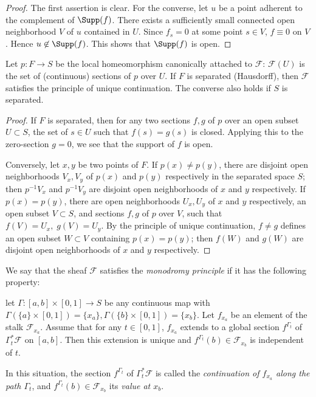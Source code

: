 \begin{proof}
 The first assertion is clear. For the converse, let $u$ be a point adherent to the complement 
 of $\Supp(f)$. There exists a sufficiently small connected open
 neighborhood $V$ of $u$ contained in $U$. Since $f_s=0$ at some
 point $s\in V$, $f\equiv 0$ on $V$. Hence $u\not\in\Supp(f)$. This shows that $\Supp(f)$ is open.
\end{proof}

\begin{lem}\label{lem-separated}
 Let $p: F\rightarrow S$
 be the local homeomorphism canonically attached to
 $\mathcal{F} $: $\mathcal{F}(U)$ is the set of (continuous) sections of $p$ over $U$. 
 If $F$ is separated (\ie Hausdorff), then $\mathcal{F}$ satisfies the
 principle of unique continuation. The converse also holds if $S$ is
 separated.
\end{lem}

\begin{proof} If $F$ is separated, then for any two sections $f, g$ of
 $p$ over an open subset $U\subset S$, the set of $s\in U$ such that
 $f(s)=g(s)$ is closed.  Applying this to the zero-section $g=0$, we see
 that the support of $f$ is open.

 Conversely, let $x,y $ be two points of $F$. If $p(x)\neq p(y)$, there
 are disjoint open neighborhoods $V_x, V_y$ of $p(x)$ and $p(y)$
 respectively in the separated space $S$; then $p^{-1}V_x$ and
 $p^{-1}V_y$ are disjoint open neighborhoods of $x$ and $y$
 respectively. If $p(x)= p(y)$, there are open neighborhoods $U_x, U_y$
 of $x$ and $y$ respectively, an open subset $V\subset S$, and sections
 $f,g$ of $p$ over $V$, such that $f(V)=U_x,\;g(V)=U_y$. By the
 principle of unique continuation, $f\neq g$ defines an open subset
 $W\subset V$ containing $p(x)=p(y)$; then $f(W)$ and $g(W)$ are
 disjoint open neighborhoods of $x$ and $y$ respectively.
\end{proof}

\begin{dfn}
 We say that the sheaf $\mathcal{F}$ 
 satisfies the {\it monodromy principle} if it has the following property:

 let $\Gamma: [a,b]\times [0,1] \rightarrow S$ be any 
 continuous map with
 $\Gamma(\{a\}\times [0,1])=\{x_a\}, \Gamma(\{b\}\times
 [0,1])=\{x_b\}$. Let $f_{x_a}$ be an element of the stalk
 $\mathcal{F}_{x_a}$. Assume that for any
 $t\in [0,1]$, $f_{x_a}$ extends to a global section $f^{\Gamma_t}$ of
 $\Gamma_t^{\ast} \mathcal{F}$ on
 $[a,b]$. Then this extension is unique and
 $f^{\Gamma_t}(b)\in \mathcal{F}_{x_b}$ is independent of $t$.

 In this situation, the section $f^{\Gamma_t}$ of 
 $\Gamma_t^{\ast} \mathcal{F}$ is called the
 {\it continuation of $f_{x_a}$ along the path $\Gamma_t$}, and 
 $f^{\Gamma_t}(b)\in \mathcal{F}_{x_b}$ its {\it value at $x_b$}.
\end{dfn}

